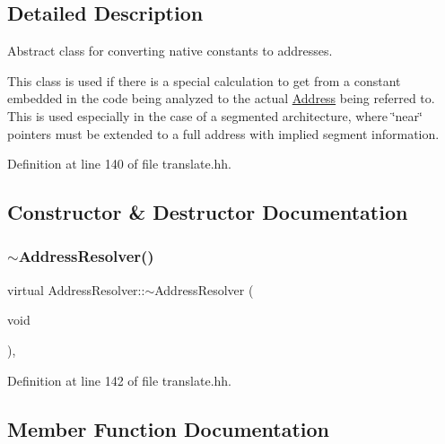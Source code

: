 \subsection{Detailed Description}
Abstract class for converting native constants to addresses. 

This class is used if there is a special calculation to get from a constant embedded in the code being analyzed to the actual \mbox{\hyperlink{class_address}{Address}} being referred to. This is used especially in the case of a segmented architecture, where \char`\"{}near\char`\"{} pointers must be extended to a full address with implied segment information. 

Definition at line 140 of file translate.\+hh.



\subsection{Constructor \& Destructor Documentation}
\mbox{\label{class_address_resolver_a31eb658deea94b4619c4c1bc4e11be06}} 
\subsubsection{\texorpdfstring{$\sim$AddressResolver()}{~AddressResolver()}}
{\footnotesize\ttfamily virtual Address\+Resolver\+::$\sim$\+Address\+Resolver (\begin{DoxyParamCaption}\item[{void}]{ }\end{DoxyParamCaption})\hspace{0.3cm}{\ttfamily [inline]}, {\ttfamily [virtual]}}



Definition at line 142 of file translate.\+hh.



\subsection{Member Function Documentation}
\mbox{\label{class_address_resolver_a5ac794d1a7c5c8c678ac5fecdf0499ff}} 

